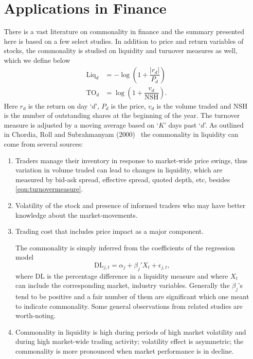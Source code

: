 \section{Applications in Finance}

There is a vast literature on commonality in finance and the summary presented here is based on a few select studies. In addition to price and return variables of stocks, the commonality is studied on liquidity and turnover measures as well, which we define below
	\begin{equation} \label{eqn:turnovermeasure}
	\begin{split}
	\text{Liq}_d&= - \log \left( 1 + \dfrac{|r_d|}{P_d} \right) \\
	\text{TO}_d&= \log \left( 1 + \dfrac{v_d}{\text{NSH}} \right).
	\end{split}
	\end{equation}
Here $r_d$ is the return on day `$d$', $P_d$ is the price, $v_d$ is the volume traded and NSH is the number of outstanding shares at the beginning of the year. The turnover measure is adjusted by a moving average based on `$K$' days past `$d$'. As outlined in Chordia, Roll and Subrahmanyam (2000)~\cite{chordia} the commonality in liquidity can come from several sources: 
	\begin{enumerate}[--]
	\item Traders manage their inventory in response to market-wide price swings, thus variation in volume traded can lead to changes in liquidity, which are measured by bid-ask spread, effective spread, quoted depth, etc, besides \eqref{eqn:turnovermeasure}.
	\item Volatility of the stock and presence of informed traders who may have better knowledge about the market-movements. 
	\item Trading cost that includes price impact as a major component. 
	
	The commonality is simply inferred from the coefficients of the regression model
		\begin{equation} \label{eqn:coefficreg}
		\text{DL}_{j,t}= \alpha_j + \beta_j' X_t + \epsilon_{j,t},
		\end{equation}
	where $\text{DL}$ is the percentage difference in a liquidity measure and where $X_t$ can include the corresponding market, industry variables. Generally the $\beta_j$'s tend to be positive and a fair number of them are significant which one meant to indicate commonality. Some general observations from related studies are worth-noting. 
	\item Commonality in liquidity is high during periods of high market volatility and during high market-wide trading activity; volatility effect is asymmetric; the commonality is more pronounced when market performance is in decline. 
	\end{enumerate}



